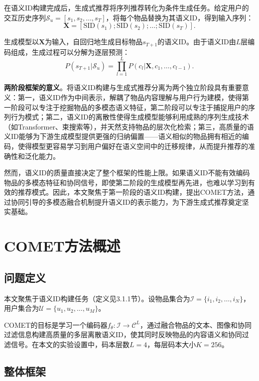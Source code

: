 在语义ID构建完成后，生成式推荐将序列推荐转化为条件生成任务。给定用户的交互历史序列$\mathcal{S}_u = [s_1, s_2, \ldots, s_T]$，将每个物品替换为其语义ID，得到输入序列：
\begin{equation}
  \mathbf{X} = [\text{SID}(s_1); \text{SID}(s_2); \ldots; \text{SID}(s_T)].
\end{equation}

生成模型以$\mathbf{X}$为输入，自回归地生成目标物品$s_{T+1}$的语义ID。由于语义ID由$L$层编码组成，生成过程可以分解为逐层预测：
\begin{equation}
  P(s_{T+1} | \mathcal{S}_u) = \prod_{l=1}^{L} P(c_l | \mathbf{X}, c_1, \ldots, c_{l-1}).
\end{equation}

\textbf{两阶段框架的意义}。将语义ID构建与生成式推荐分离为两个独立阶段具有重要意义：第一，语义ID作为中间表示，解耦了物品内容理解与用户行为建模，使得第一阶段可以专注于挖掘物品的多模态语义特征，第二阶段可以专注于捕捉用户的序列行为模式；第二，语义ID的离散性使得生成模型能够利用成熟的序列生成技术（如Transformer、束搜索等），并天然支持物品的层次化检索；第三，高质量的语义ID能够为下游生成模型提供更强的归纳偏置——语义相似的物品拥有相近的编码，使得模型更容易学习到用户偏好在语义空间中的迁移规律，从而提升推荐的准确性和泛化能力。

然而，语义ID的质量直接决定了整个框架的性能上限。如果语义ID不能有效编码物品的多模态特征和协同信号，即使第二阶段的生成模型再先进，也难以学习到有效的推荐模式。因此，本文聚焦于第一阶段的语义ID构建，提出COMET方法，通过协同引导的多模态融合机制提升语义ID的表示能力，为下游生成式推荐奠定坚实基础。

\section{COMET方法概述}

\subsection{问题定义}

本文聚焦于语义ID构建任务（定义见3.1.1节）。设物品集合为$\mathcal{I} = \{i_1, i_2, \ldots, i_N\}$，用户集合为$\mathcal{U} = \{u_1, u_2, \ldots, u_M\}$。

COMET的目标是学习一个编码器$f_{\theta}: \mathcal{I} \to \mathcal{C}^L$，通过融合物品的文本、图像和协同过滤信息构建高质量的多层离散语义ID，使其同时反映物品的内容语义和协同过滤信号。在本文的实验设置中，码本层数$L=4$，每层码本大小$K=256$。

\subsection{整体框架}

